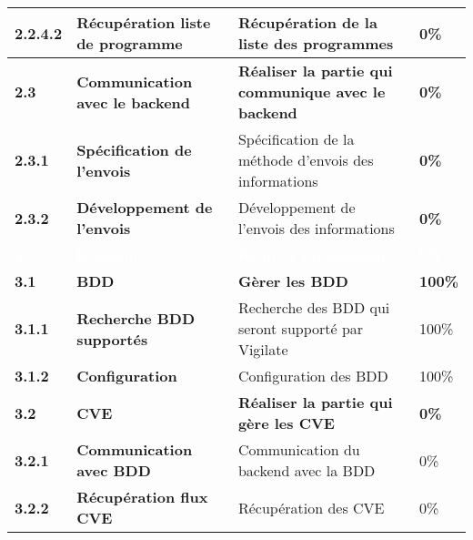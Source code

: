\begin{supertabular}{|p{2.8cm} p{6cm}|p{5cm}|R{2cm}|}
  \hspace{12pt}
  \textbf{2.2.4.2}  & \textbf{Récupération liste de programme} & Récupération de la liste des programmes & 0\% \\
  \hline

  \textbf{2.3}  & \textbf{Communication avec le backend} & \textbf{Réaliser la partie qui communique avec le backend} & \textbf{0\%} \\
  \hline

  \hspace{6pt}
  \textbf{2.3.1}  & \textbf{Spécification de l'envois} & Spécification de la méthode d'envois des informations & \textbf{0\%} \\
  \hline

  \hspace{6pt}
  \textbf{2.3.2}  & \textbf{Développement de l'envois} & Développement de l'envois des informations & \textbf{0\%} \\
  \hline



  \textcolor{white}{\textbf{3}}  & \textcolor{white}{\textbf{Backend}} & \textcolor{white}{\textbf{Réaliser un backend}} & \textcolor{white}{\textbf{9\%}} \\
  \hline

  \textbf{3.1}  & \textbf{BDD} & \textbf{Gèrer les BDD} & \textbf{100\%} \\
  \hline

  \hspace{6pt}
  \textbf{3.1.1}  & \textbf{Recherche BDD supportés} & Recherche des BDD qui seront supporté par Vigilate & 100\% \\
  \hline

  \hspace{6pt}
  \textbf{3.1.2}  & \textbf{Configuration} & Configuration des BDD & 100\% \\
  \hline


  \textbf{3.2}  & \textbf{CVE} & \textbf{Réaliser la partie qui gère les CVE} & \textbf{0\%} \\
  \hline

  \hspace{6pt}
  \textbf{3.2.1}  & \textbf{Communication avec BDD} & Communication du backend avec la BDD  & 0\% \\
  \hline

  \hspace{6pt}
  \textbf{3.2.2}  & \textbf{Récupération flux CVE} & Récupération des CVE & 0\% \\
  \hline


\end{supertabular}
